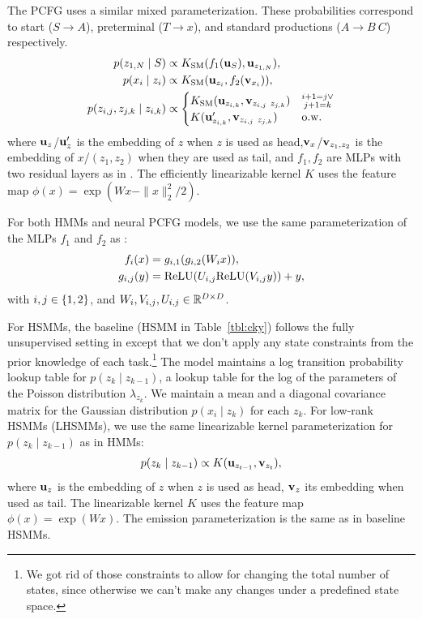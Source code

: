 \documentclass{article}
\begin{document}
The PCFG uses a similar mixed parameterization. These probabilities correspond to start ($S\to A$), preterminal ($T\to x$), and standard productions ($A\to B\ C$) respectively.
\begin{equation}
\label{eqn:pcfgparam}
\begin{aligned}
p(z_{1,N} \mid S ) &\propto K_{\mathrm{SM}}(f_1(\mathbf{u}_{S}), \mathbf{u}_{z_{1,N}}),\\
p(x_i \mid z_i) &\propto K_{\mathrm{SM}}(\mathbf{u}_{z_i}, f_2(\mathbf{v}_{x_i})),\\
p( z_{i,j}, z_{j,k} \mid z_{i,k}) &\propto \begin{cases}
  K_{\mathrm{SM}}(\mathbf{u}_{z_{i,k}}, \mathbf{v}_{z_{i,j}\ z_{j,k}}) & \substack{i+1 = j \lor \\j+1=k} \\ 
 K(\mathbf{u}_{z_{i,k}}', \mathbf{v}_{z_{i,j}\ z_{j,k}}) &\text{o.w.} \\
\end{cases}\\
\end{aligned}
\end{equation}
where $\mathbf{u}_{z}$/$\mathbf{u}_z'$ is the embedding of $z$ when $z$ is used as head,$\mathbf{v}_{x}$/$\mathbf{v}_{z_1, z_2}$ is the embedding of $x$/$(z_1, z_2)$ when they are used as tail, and $f_1, f_2$ are MLPs with two residual layers as in \citet{kim2019cpcfg}. The efficiently linearizable kernel $K$ uses the feature map $\phi(x) = \exp(Wx - \|x\|_2^2/2)$.

For both HMMs and neural PCFG models, we use the same parameterization of the MLPs $f_1$ and $f_2$ as \citet{kim2019cpcfg}:
\begin{equation}
\label{eqn:res}
\begin{aligned}
f_i(x) &= g_{i,1}(g_{i,2}(W_i x)),\\
g_{i,j}(y) &= \mathrm{ReLU}(U_{i,j} \mathrm{ReLU}(V_{i,j} y)) + y,
\end{aligned}
\end{equation}
with $i,j \in \left\{1,2\right\}$, and
$W_i,V_{i,j},U_{i,j} \in \mathbb{R}^{D \times D}$. 


For HSMMs, the baseline ({HSMM} in Table~\ref{tbl:cky}) follows the fully unsupervised setting in \citet{fried2020learning} except that we don't apply any state constraints from the prior knowledge of each task.\footnote{We got rid of those constraints to allow for changing the total number of states, since otherwise we can't make any changes under a predefined state space.} The model maintains a log transition probability lookup table for $p(z_k \mid z_{k-1})$, a lookup table for the log of the parameters of the Poisson distribution $\lambda_{z_k}$. We maintain a mean and a diagonal covariance matrix for the Gaussian distribution $p(x_i\mid z_k)$ for each $z_k$. For low-rank HSMMs (LHSMMs), we use the same linearizable kernel parameterization for $p(z_k \mid z_{k-1})$ as in HMMs:
\begin{equation}
    p(z_k \mid z_{k-1}) \propto K(\mathbf{u}_{z_{t-1}}, \mathbf{v}_{z_t}),
\end{equation}
where $\mathbf{u}_{z}$ is the embedding of $z$ when $z$ is used as head, $\mathbf{v}_{z}$ its embedding when used as tail.  The linearizable kernel $K$ uses the feature map $\phi(x) = \exp(Wx)$. The emission parameterization is the same as in baseline HSMMs.
\end{document}
